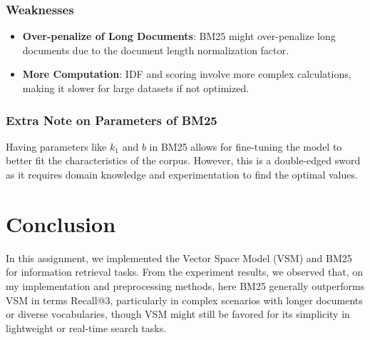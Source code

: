 \documentclass[12pt,letterpaper]{article}
\begin{document}
\subsubsection{Weaknesses}
\begin{itemize}
    \item \textbf{Over-penalize of Long Documents}: BM25 might over-penalize long documents due to the document length normalization factor. 
    \item \textbf{More Computation}: IDF and scoring involve more complex calculations, making it slower for large datasets if not optimized.
\end{itemize}
\subsubsection{Extra Note on Parameters of BM25}
Having parameters like \(k_1\) and \(b\) in BM25 allows for fine-tuning the model to better fit the characteristics of the corpus. However, this is a double-edged sword as it requires domain knowledge and experimentation to find the optimal values.

\section{Conclusion}
In this assignment, we implemented the Vector Space Model (VSM) and BM25 for information retrieval tasks. From the experiment results, we observed that, on my implementation and preprocessing methods, here BM25 generally outperforms VSM in terms Recall@3, particularly in complex scenarios with longer documents or diverse vocabularies, though VSM might still be favored for its simplicity in lightweight or real-time search tasks.
\end{document}
